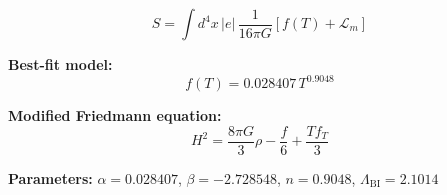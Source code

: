 
\begin{equation}
  S = \int d^4x \, |e| \, \frac{1}{16\pi G} \left[ f(T) + \mathcal{L}_m \right]
\end{equation}

\textbf{Best-fit model:}
\begin{equation}
  f(T) = 0.028407 \, T^{0.9048}
\end{equation}

\textbf{Modified Friedmann equation:}
\begin{equation}
  H^2 = \frac{8\pi G}{3} \rho - \frac{f}{6} + \frac{T f_T}{3}
\end{equation}

\textbf{Parameters:}
$\alpha = 0.028407$, \quad
$\beta = -2.728548$, \quad
$n = 0.9048$, \quad
$\Lambda_{\text{BI}} = 2.1014$